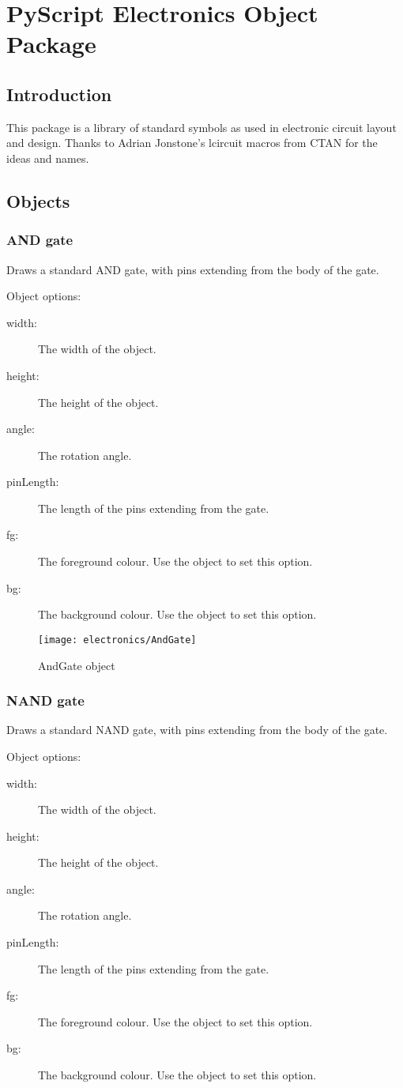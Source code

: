 
\chapter{PyScript Electronics Object Package}

\section{Introduction}

This package is a library of standard symbols as used in electronic circuit
layout and design.  Thanks to Adrian Jonstone's lcircuit macros from CTAN
for the ideas and names.

\section{Objects}

\subsection{AND gate}
Draws a standard AND gate, with pins extending from the body of the gate.

Object options:
\begin{description}
\item[width:] The width of the object.
\item[height:] The height of the object.
\item[angle:] The rotation angle.
\item[pinLength:] The length of the pins extending from the gate.
\item[fg:] The foreground colour.  Use the  object to set this
option.
\item[bg:] The background colour.  Use the  object to set this
option.
\end{description}

\begin{figure}[h]
\centerline{\texttt{[image: electronics/AndGate]}}
\caption{AndGate object}
\label{fig:and_gate}
\end{figure}

\subsection{NAND gate}
Draws a standard NAND gate, with pins extending from the body of the gate.

Object options:
\begin{description}
\item[width:] The width of the object.
\item[height:] The height of the object.
\item[angle:] The rotation angle.
\item[pinLength:] The length of the pins extending from the gate.
\item[fg:] The foreground colour.  Use the  object to set this
option.
\item[bg:] The background colour.  Use the  object to set this
option.
\end{description}

